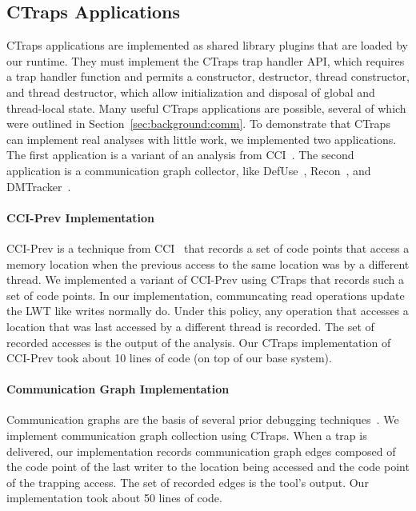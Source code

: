 \documentclass[pageno,nohyperref]{jpaper}
\newcommand{\ctraps}{CTraps\xspace}
\begin{document}
\subsection{\ctraps Applications}
\label{sec:apps}
\ctraps applications are implemented as shared library plugins that are loaded
by our runtime.  They must implement the \ctraps trap handler API, which
requires a trap handler function and permits a constructor, destructor, thread
constructor, and thread destructor, which allow initialization and disposal of
global and thread-local state.  Many useful \ctraps applications are possible,
several of which were outlined in Section~\ref{sec:background:comm}.    To
demonstrate that \ctraps can implement real analyses with little work, we
implemented two applications. The first application is a variant of an 
analysis from CCI~\cite{cci}.  The second application is a communication graph
collector, like DefUse~\cite{defuse}, Recon~\cite{recon}, and
DMTracker~\cite{dmtracker}.

\paragraph{CCI-Prev Implementation}
CCI-Prev is a technique from CCI~\cite{cci} that records a set of code points
that access a memory location when the previous access to the same location was
by a different thread.  We implemented a variant of CCI-Prev using \ctraps that
records such a set of code points.  In our implementation, communcating read
operations update the LWT like writes normally do.  Under this policy, any
operation that accesses a location that was last accessed by a different thread
is recorded.  The set of recorded accesses is the output of the analysis.  Our
\ctraps implementation of CCI-Prev took about 10 lines of code (on top of our
base system). 

\paragraph{Communication Graph Implementation} Communication graphs are the
basis of several prior debugging techniques~\cite{recon, bugaboo, defuse}.  We
implement communication graph collection using \ctraps.  When a trap is
delivered, our implementation records communication graph edges composed of the
code point of the last writer to the location being accessed and the code point
of the trapping access.  The set of recorded edges is the tool's output.  Our
implementation took about 50 lines of code. 
\end{document}
